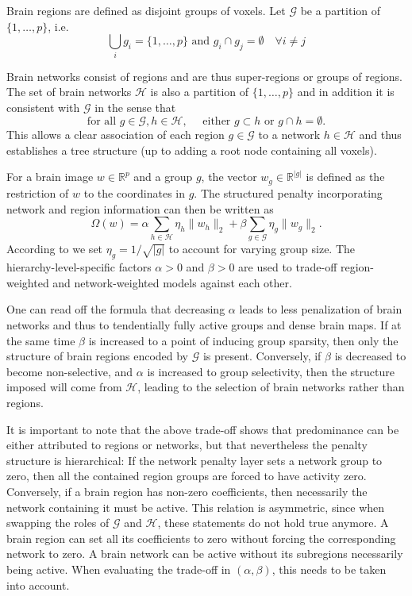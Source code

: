 \documentclass{article}
\newcommand{\R}{\mathbb{R}}
\begin{document}
Brain regions are defined as disjoint groups of voxels. Let \(\mathcal G\)
be a partition of \(\{1, \dots, p\}\), i.e.
\[  \bigcup_{i} g_i = \{1, \dots, p\} \textrm{ and } g_i\cap g_j=\emptyset
\quad\forall i\not=j\]

Brain networks consist of regions and are thus super-regions or groups of 
regions. The set of brain networks \(\mathcal{H}\) is also a partition of 
\(\{1, \dots, p\}\) and in addition it is consistent with \(\mathcal G\) in
the sense that
\[\textrm{for all }g\in\mathcal G, h\in\mathcal H,\quad
\textrm{ either } g\subset h\textrm{ or }g\cap h = \emptyset.\]
This allows a clear association of each region \(g\in\mathcal G\) to a 
network \(h\in\mathcal H\) and thus establishes a tree structure (up to 
adding a root node containing all voxels).

For a brain image \(w\in\R^p\) and a group \(g\), the vector 
\(w_g\in\R^{|g|}\) is defined as the restriction of \(w\) to the coordinates
 in \(g\). The structured penalty incorporating network
and region information can then be written as
\[\Omega(w) = \alpha\sum_{h\in\mathcal H}\eta_h\|w_h\|_2 + \beta\sum_{g\in\mathcal G}\eta_g\|w_g\|_2.\]
According to \cite{yuan2006model} we set \(\eta_g = 1/\sqrt{|g|}\) to
account for varying group size. The hierarchy-level-specific factors 
\(\alpha > 0\) and \(\beta > 0\) are used to trade-off region-weighted and
network-weighted models against each other.

One can read off the formula that decreasing \(\alpha\) leads to less 
penalization of brain networks and thus to tendentially fully active groups
and dense brain maps. If at the same time \(\beta\) is increased to a point
of inducing group sparsity, then only the structure of brain regions encoded
by \(\mathcal G\) is present. Conversely, if \(\beta\) is decreased to 
become non-selective, and \(\alpha\) is increased to group selectivity,
then the structure imposed will come from \(\mathcal H\), leading to the
selection of brain networks rather than regions.

It is important to note that the above trade-off shows that predominance
can be either attributed to regions or networks, but that nevertheless the
penalty structure is hierarchical: If the network penalty layer sets a
network group to zero, then all the contained region groups are forced to
have activity zero. Conversely, if a brain region has non-zero coefficients,
then necessarily the network containing it must be active.
This relation is asymmetric, since when swapping the roles of \(\mathcal G\)
 and \(\mathcal H\), these statements do not hold true anymore. A brain 
region can set all its coefficients to zero without forcing the 
corresponding network to zero. A brain network can be active without its
subregions necessarily being active.
When evaluating the trade-off in \((\alpha, \beta)\), this needs to be taken
into account.
\end{document}
